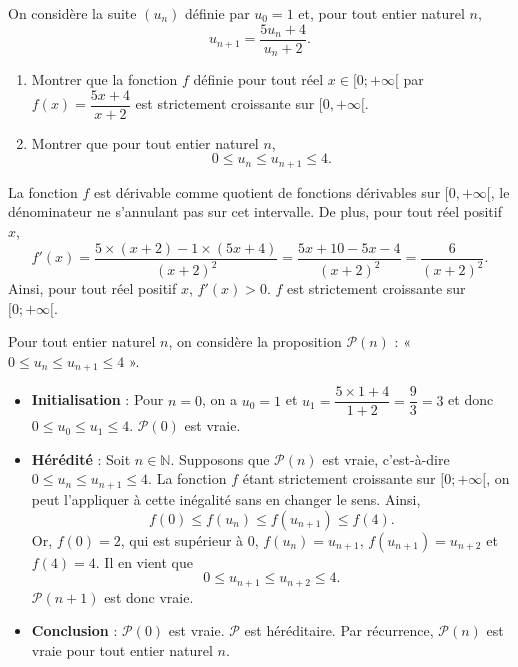 \documentclass[11pt,fleqn]{book} %
\begin{document}
\begin{exercise}[subtitle={(Métropole 2021)}]
On considère la suite \((u_n)\) définie par \(u_0=1\) et, pour tout entier naturel \(n\),
\[u_{n+1}=\dfrac{5u_n+4}{u_n+2}.\]

\begin{enumerate}
\item Montrer que la fonction \(f\) définie pour tout réel \(x\in [0;+\infty [ \) par \(f(x)=\dfrac{5x+4}{x+2}\) est strictement croissante sur \([0,+\infty [\).
\item Montrer que pour tout entier naturel \(n\), 
\[ 0 \leqslant u_n \leqslant u_{n+1} \leqslant 4.\]
\end{enumerate}\end{exercise}
\begin{solution}La fonction \(f\) est dérivable comme quotient de fonctions dérivables sur \([0,+\infty [\), le dénominateur ne s'annulant pas sur cet intervalle. De plus, pour tout réel positif \(x\),
\[f'(x) = \dfrac{5 \times (x+2) - 1 \times (5x+4)}{(x+2)^2} = \dfrac{5x+10-5x-4}{(x+2)^2}=\dfrac{6}{(x+2)^2}.\]
Ainsi, pour tout réel positif \(x\), \(f'(x)> 0\). \(f\) est strictement croissante sur \([0;+\infty[\).

 Pour tout entier naturel \(n\), on considère la proposition \(\mathcal{P}(n)\) : « \(0 \leqslant u_n \leqslant u_{n+1} \leqslant 4\) ».
\begin{itemize} \item \textbf{Initialisation} : Pour \(n=0\), on a \(u_0=1\) et \(u_1 = \dfrac{5\times 1+4}{1+2} =\dfrac{9}{3}=3\) et donc \(0 \leqslant u_0 \leqslant u_1 \leqslant 4\). \(\mathcal{P}(0)\) est vraie.
\item \textbf{Hérédité} : Soit \(n\in\mathbb{N}\). Supposons que \(\mathcal{P}(n)\) est vraie, c'est-à-dire \(0 \leqslant u_n \leqslant u_{n+1} \leqslant 4\). 
La fonction \(f\) étant strictement croissante sur \([0;+\infty[ \), on peut l'appliquer à cette inégalité sans en changer le sens. Ainsi,
\[f(0) \leqslant f(u_n) \leqslant f(u_{n+1}) \leqslant f(4).\]
Or, \(f(0)=2\), qui est supérieur à 0, \(f(u_n)=u_{n+1}\), \(f(u_{n+1})=u_{n+2}\) et \(f(4)=4\). Il en vient que
\[0 \leqslant u_{n+1} \leqslant u_{n+2} \leqslant 4.\]
\(\mathcal{P}(n+1)\) est donc vraie.
\item \textbf{Conclusion} : \(\mathcal{P}(0)\) est vraie. \(\mathcal{P}\) est héréditaire. Par récurrence, \(\mathcal{P}(n)\) est vraie pour tout entier naturel \(n\).\end{itemize}\end{solution}
\end{document}
